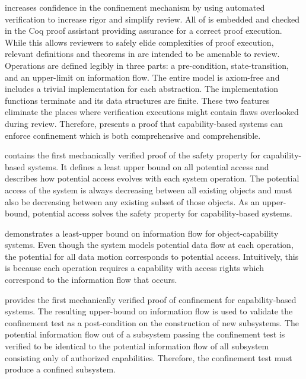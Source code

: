 \TMmodelName{} increases confidence in the confinement mechanism by using automated verification to increase rigor and simplify review.
All of \TMmodelName{} is embedded and checked in the Coq proof assistant providing assurance for a correct proof execution.
While this allows reviewers to safely elide complexities of proof execution, relevant definitions and theorems in \TMmodelName{} are intended to be amenable to review.
Operations are defined legibly in three parts: a pre-condition, state-transition, and an upper-limit on information flow.
The entire model is axiom-free and includes a trivial implementation for each abstraction.
The implementation functions terminate and its data structures are finite.
These two features eliminate the places where verification executions might contain flaws overlooked during review.
Therefore, \TMmodelName{} presents a proof that capability-based systems can enforce confinement which is both comprehensive and comprehensible.

\TMmodelName{} contains the first mechanically verified proof of the safety property for capability-based systems.
It defines a least upper bound on all potential access and describes how potential access evolves with each system operation.
The potential access of the system is always decreasing between all existing objects and must also be decreasing between any existing subset of those objects.
As an upper-bound, potential access solves the safety property for capability-based systems.

\TMmodelName{} demonstrates a least-upper bound on information flow for object-capability systems.
Even though the system models potential data flow at each operation, the potential for all data motion corresponds to potential access.
Intuitively, this is because each operation requires a capability with access rights which correspond to the information flow that occurs.

\TMmodelName{} provides the first mechanically verified proof of confinement for capability-based systems.
The resulting upper-bound on information flow is used to validate the confinement test as a post-condition on the construction of new subsystems.
The potential information flow out of a subsystem passing the confinement test is verified to be identical to the potential information flow of all subsystem consisting only of authorized capabilities.
Therefore, the confinement test must produce a confined subsystem.

